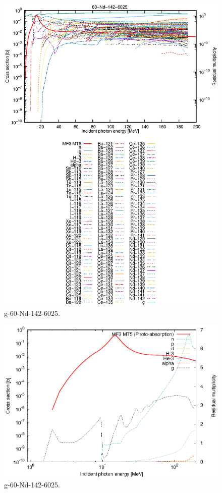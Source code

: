 \begin{figure}
 \includegraphics[width=\linewidth]{eps/g_60-Nd-142_6025.eps}
  \caption{g-60-Nd-142-6025.}
\end{figure}
\newpage \clearpage

\begin{figure}
 \includegraphics[width=\linewidth]{eps-log/g_60-Nd-142_6025.eps}
 \caption{g-60-Nd-142-6025.}
\end{figure}
\newpage \clearpage

